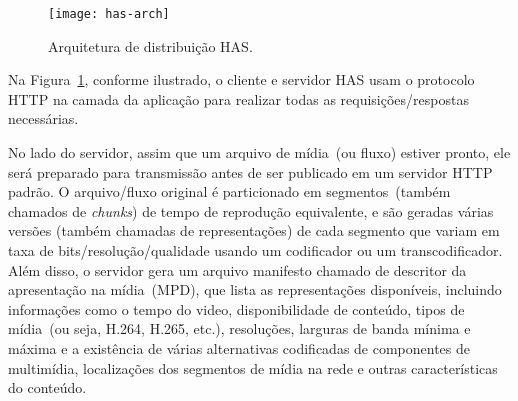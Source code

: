 \vspace{0.5cm}
\begin{figure}[htb]
  \centering
  \texttt{[image: has-arch]}
  \caption{Arquitetura de distribuição HAS.}
  \label{fig:has-arch}
\end{figure}

%

Na Figura~\ref{fig:has-arch}, conforme ilustrado, o cliente e servidor HAS usam o protocolo HTTP na camada da aplicação para realizar todas as requisições/respostas necessárias. 

No lado do servidor, assim que um arquivo de mídia~(ou fluxo) estiver pronto, ele será preparado para transmissão antes de ser publicado em um servidor HTTP padrão. O arquivo/fluxo original é particionado em segmentos~(também chamados de \textit{chunks}) de tempo de reprodução equivalente, e são geradas várias versões (também chamadas de representações) de cada segmento que variam em taxa de bits/resolução/qualidade usando um codificador ou um transcodificador. 
Além disso, o servidor gera um arquivo manifesto chamado de descritor da apresentação na mídia~(MPD), que lista as representações disponíveis, incluindo informações como o tempo do video, disponibilidade de conteúdo, tipos de mídia~(ou seja, H.264, H.265, etc.), resoluções, larguras de banda mínima e máxima e a existência de várias alternativas codificadas de componentes de multimídia, localizações dos segmentos de mídia na rede e outras características do conteúdo.

